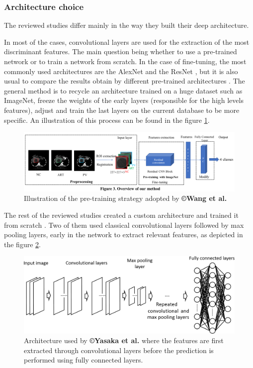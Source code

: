 \subsubsection{Architecture choice}\label{architecure-choice}



The reviewed studies differ mainly in the way they built their deep
architecture.

In most of the cases, convolutional layers are used for the extraction
of the most discriminant features. The main question being whether to
use a pre-trained network or to train a network from scratch. In the
case of fine-tuning, the most commonly used architectures are the
AlexNet and the ResNet \cite{WANG2019,Wang2018,Yamada2019,Peng2020}, but it is also usual to
compare the results obtain by different pre-trained architectures \cite{WANG2019,Yamada2019}. The general method
is to recycle an architecture trained on a huge dataset such as
ImageNet, freeze the weights of the early layers (responsible for the
high levels features), adjust and train the last layers on the current
database to be more specific.
An illustration of this process can be found in the figure \ref{Wang2018_Fig3}.

\begin{figure}[th!]
\centering
\includegraphics[width=0.9\linewidth]{images/image6}
\caption{Illustration of the pre-training strategy adopted by \textbf{©Wang et al.} \cite{Wang2018}}
\label{Wang2018_Fig3}
\end{figure}


The rest of the reviewed studies created a custom architecture and
trained it from scratch \cite{Yasaka2018a,Yasaka2018,Liang2018,Yang2019}.
Two of them used classical convolutional layers followed by max pooling
layers, early in the network to extract relevant features, as depicted
in the figure \ref{Yasaka2018_Fig2}.

\begin{figure}[th!]
\centering
\includegraphics[width=0.7\linewidth]{images/yasaka2018}
\caption{Architecture used by \textbf{©Yasaka et al.} where the features are first extracted through convolutional layers before the prediction is performed using fully connected layers. \cite{Yasaka2018}}
\label{Yasaka2018_Fig2}
\end{figure}

